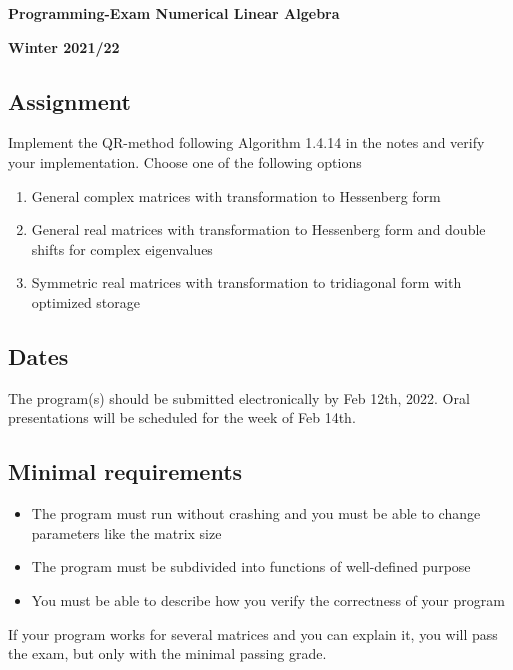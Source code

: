 \documentclass[a4paper]{article}
\begin{document}
\begin{center}
  \textbf{\Large Programming-Exam Numerical Linear Algebra}
  
  \textbf{Winter 2021/22}
\end{center}

\subsection*{Assignment}
Implement the QR-method following Algorithm 1.4.14 in the notes and
verify your implementation. Choose one of the following options
\begin{enumerate}
\item General complex matrices with transformation to Hessenberg form
\item General real matrices with transformation to Hessenberg form and
  double shifts for complex eigenvalues
\item Symmetric real matrices with transformation to tridiagonal form
  with optimized storage
\end{enumerate}

\subsection*{Dates}

The program(s) should be submitted electronically by Feb 12th,
2022. Oral presentations will be scheduled for the week of Feb 14th.

\subsection*{Minimal requirements}
\begin{itemize}
\item The program must run without crashing and you must be able to
  change parameters like the matrix size
\item The program must be subdivided into functions of well-defined
  purpose
\item You must be able to describe how you verify the correctness of
  your program
\end{itemize}

If your program works for several matrices and you can explain it, you will pass the exam, but only with the minimal passing grade.
\end{document}
